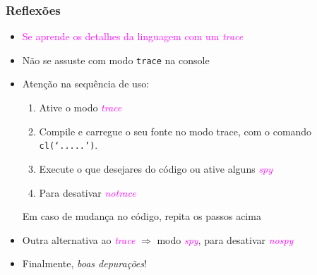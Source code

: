 \begin{frame}[fragile]
\frametitle{Reflexões}

\begin{itemize}
  \item \textcolor{magenta}{Se aprende os detalhes da linguagem com um \textit{trace}}
  
  \pause
    \item Não se assuste com modo \texttt{trace} na console
  
  
  \pause
    \item Atenção na sequência de uso: 
    
    \begin{enumerate}
      \item Ative o modo \textcolor{magenta}{\textit{trace}}
      \item Compile e carregue o seu fonte no modo trace, com o comando \texttt{cl(`.....')}.
      \item Execute o que desejares do código ou ative alguns \textcolor{magenta}{\textit{spy}}
      \item Para desativar  \textcolor{magenta}{\textit{notrace}}
    \end{enumerate}
    \pause
    Em caso de mudança no código, repita os passos acima
       
  \pause
    \item Outra alternativa ao \textcolor{magenta}{\textit{trace}} $\Rightarrow$ modo \textcolor{magenta}{\textit{spy}}, para desativar
    \textcolor{magenta}{\textit{nospy}}
    
    
\pause
    \item Finalmente, \textit{boas depurações}!        
  
\end{itemize}


\end{frame}
